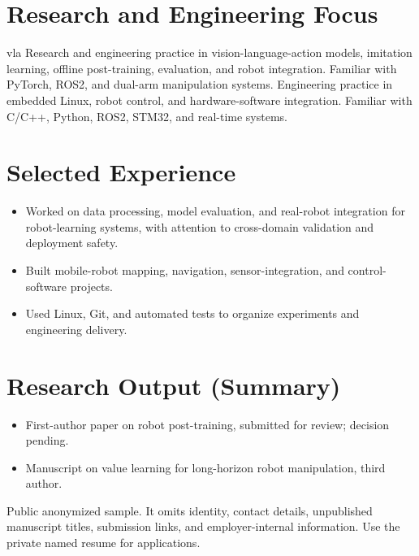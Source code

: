 \documentclass[10.5pt,a4paper]{ctexart}
\def\vla{vla}
\begin{document}
  \section*{Research and Engineering Focus}
  \ifx\ResumeTrack\vla
    Research and engineering practice in vision-language-action models, imitation learning, offline post-training, evaluation, and robot integration. Familiar with PyTorch, ROS2, and dual-arm manipulation systems.
  \else
    Engineering practice in embedded Linux, robot control, and hardware-software integration. Familiar with C/C++, Python, ROS2, STM32, and real-time systems.
  \fi
  \section*{Selected Experience}
  \begin{itemize}
    \item Worked on data processing, model evaluation, and real-robot integration for robot-learning systems, with attention to cross-domain validation and deployment safety.
    \item Built mobile-robot mapping, navigation, sensor-integration, and control-software projects.
    \item Used Linux, Git, and automated tests to organize experiments and engineering delivery.
  \end{itemize}
  \section*{Research Output (Summary)}
  \begin{itemize}
    \item First-author paper on robot post-training, submitted for review; decision pending.
    \item Manuscript on value learning for long-horizon robot manipulation, third author.
  \end{itemize}
  \vfill
  {\footnotesize\color{gray}Public anonymized sample. It omits identity, contact details, unpublished manuscript titles, submission links, and employer-internal information. Use the private named resume for applications.}
\fi
\end{document}
